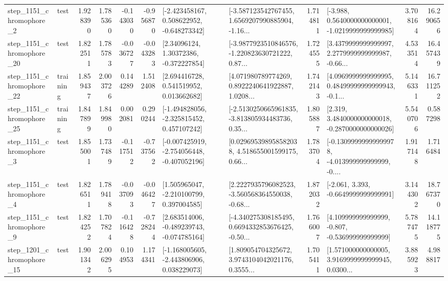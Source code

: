 \begin{tabular}{llrrrrllrlrr}
  step\_1151\_chromophore\_2 &      test &      1.928390 &    1.785360 &     -0.143030 & -0.956870 &   [-2.423458167, 0.508622952, -0.648273342] &  [-3.587123542767455, 1.6569207990885904, -1.16... &       1.714811 &  [-3.988, 0.5640000000000001, -1.0219999999999985] &            3.708164 &         16.290656 \\
 step\_1151\_chromophore\_20 &      test &      1.822511 &    1.785783 &     -0.036727 & -0.043283 &      [2.34096124, 1.30372386, -0.372227854] &  [-3.9877923510846576, -1.220823630721222, 0.87... &       1.724555 &  [3.4379999999999997, 2.2779999999999987, -0.66... &            4.533514 &         16.457439 \\
 step\_1151\_chromophore\_22 &  training &      1.859437 &    2.003726 &      0.144289 &  1.512408 &     [2.694416728, 0.541519952, 0.013662682] &  [4.071980789774269, 0.8922240641922887, 1.0208... &       1.742143 &  [4.0969999999999995, 0.48499999999999943, -0.1... &            5.146331 &         16.711252 \\
 step\_1151\_chromophore\_25 &  training &      1.847899 &    1.849980 &      0.002081 &  0.290244 &   [-1.494828056, -2.325815452, 0.457107242] &  [-2.5130250665961835, -3.813805934483736, 0.35... &       1.805887 &   [2.319, 3.4840000000000018, -0.2870000000000026] &            5.540706 &          0.587298 \\
  step\_1151\_chromophore\_3 &      test &      1.855001 &    1.737489 &     -0.117512 & -0.737562 &  [-0.007425919, -2.754056448, -0.407052196] &  [0.029695398958582038, 4.518655001599175, 0.66... &       1.783704 &  [-0.13099999999999978, -4.013999999999999, -0.... &            1.917148 &          1.716484 \\
  step\_1151\_chromophore\_4 &      test &      1.826511 &    1.789418 &     -0.037093 & -0.046427 &    [1.505965047, -2.210100799, 0.397004585] &  [2.2227935796082523, -3.560568364550038, -0.68... &       1.872032 &               [-2.061, 3.393, -0.6649999999999991] &            3.144302 &         18.767370 \\
  step\_1151\_chromophore\_9 &      test &      1.824252 &    1.707824 &     -0.116428 & -0.728244 &   [2.683514006, -0.489239743, -0.074785164] &  [-4.340275308185495, 0.6694332853676425, -0.50... &       1.766007 &    [4.109999999999999, -0.807, -0.536999999999999] &            5.787475 &         14.118775 \\
 step\_1201\_chromophore\_15 &      test &      1.901342 &    2.006295 &      0.104953 &  1.174341 &   [-1.168005605, -2.443806906, 0.038229073] &  [1.809054704325672, 3.9743104042021176, 0.3555... &       1.705411 &  [1.571000000000005, 3.9169999999999945, 0.0300... &            3.885923 &          4.988817 \\

\end{tabular}
